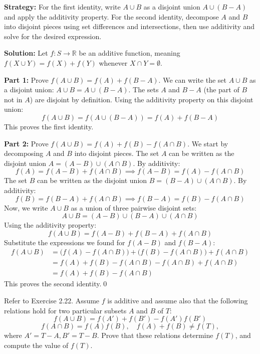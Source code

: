 \noindent\textbf{Strategy:} For the first identity, write $A \cup B$ as a disjoint union $A \cup (B-A)$ and apply the additivity property. For the second identity, decompose $A$ and $B$ into disjoint pieces using set differences and intersections, then use additivity and solve for the desired expression.

\bigskip\noindent\textbf{Solution:}  
Let $f: S \to \mathbb{R}$ be an additive function, meaning $f(X \cup Y) = f(X) + f(Y)$ whenever $X \cap Y = \emptyset$.

\textbf{Part 1:} Prove $f(A \cup B) = f(A) + f(B - A)$.
We can write the set $A \cup B$ as a disjoint union: $A \cup B = A \cup (B - A)$. The sets $A$ and $B-A$ (the part of $B$ not in $A$) are disjoint by definition.
Using the additivity property on this disjoint union:
\[ f(A \cup B) = f(A \cup (B-A)) = f(A) + f(B-A) \]
This proves the first identity.

\textbf{Part 2:} Prove $f(A \cup B) = f(A) + f(B) - f(A \cap B)$.
We start by decomposing $A$ and $B$ into disjoint pieces.
The set $A$ can be written as the disjoint union $A = (A - B) \cup (A \cap B)$. By additivity:
\[ f(A) = f(A - B) + f(A \cap B) \implies f(A-B) = f(A) - f(A \cap B) \]
The set $B$ can be written as the disjoint union $B = (B - A) \cup (A \cap B)$. By additivity:
\[ f(B) = f(B - A) + f(A \cap B) \implies f(B-A) = f(B) - f(A \cap B) \]
Now, we write $A \cup B$ as a union of three pairwise disjoint sets:
\[ A \cup B = (A - B) \cup (B - A) \cup (A \cap B) \]
Using the additivity property:
\[ f(A \cup B) = f(A-B) + f(B-A) + f(A \cap B) \]
Substitute the expressions we found for $f(A-B)$ and $f(B-A)$:
\begin{align*}
f(A \cup B) &= \big(f(A) - f(A \cap B)\big) + \big(f(B) - f(A \cap B)\big) + f(A \cap B) \\
&= f(A) + f(B) - f(A \cap B) - f(A \cap B) + f(A \cap B) \\
&= f(A) + f(B) - f(A \cap B)
\end{align*}
This proves the second identity.\qed



\begin{problembox}

Refer to Exercise 2.22. Assume \(f\) is additive and assume also that the following relations hold for two particular subsets \(A\) and \(B\) of \(T\):
\[
f(A \cup B) = f(A') + f(B') - f(A')f(B')
\]
\[
f(A \cap B) = f(A)f(B), \quad f(A) + f(B) \ne f(T),
\]
where \(A' = T - A, B' = T - B\). Prove that these relations determine \(f(T)\), and compute the value of \(f(T)\).
\end{problembox}


